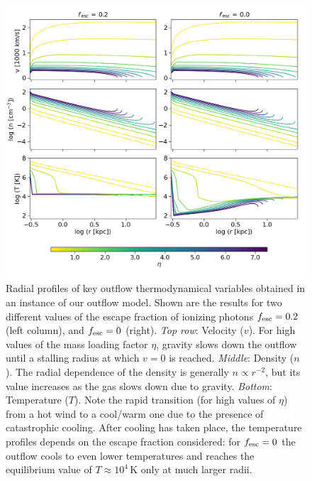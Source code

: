 \documentclass[a4paper, 12pt]{article}
\begin{document}
\begin{figure}
    \centering
    \includegraphics[width=1.\textwidth]{plots/profiles.png}
    \caption{Radial profiles of key outflow thermodynamical variables obtained in an instance of our outflow model. Shown are the results for two different values of the escape fraction of ionizing photons $f_{\rm esc}=0.2$ (left column), and $f_{\rm esc}=0$ (right).
    \textit{Top row}: Velocity ($v$). For high values of the mass loading factor $\eta$, gravity slows down the outflow until a stalling radius at which $v=0$ is reached.
    \textit{Middle}: Density ($n$). The radial dependence of the density is generally $n\propto r^{-2}$, but its value increases as the gas slows down due to gravity.
    \textit{Bottom}: Temperature ($T$). Note the rapid transition (for high values of $\eta$) from a hot wind to a cool/warm one due to the presence of catastrophic cooling. After cooling has taken place, the temperature profiles depends on the escape fraction considered: for $f_{\rm esc}=0$ the outflow cools to even lower temperatures and reaches the equilibrium value of $T\approx10^4\,\mathrm{K}$ only at much larger radii.  
         \label{fig:profiles}
    }
\end{figure}
\end{document}
